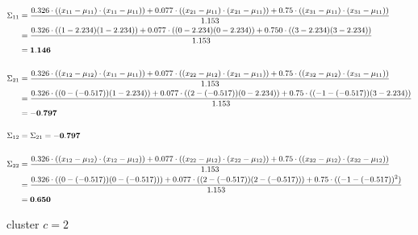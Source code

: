 \documentclass[12pt]{article}
\begin{document}
\begin{enumerate}
        \begin{equation*}
            \fontsize{9pt}{10pt}\selectfont
            \begin{aligned}
                \Sigma_{11} &= \frac{0.326 \cdot ((x_{11}-\mu_{11}) \cdot (x_{11} - \mu_{11}))+ 0.077 \cdot ((x_{21}-\mu_{11}) \cdot (x_{21} - \mu_{11}))+ 0.75 \cdot ((x_{31}-\mu_{11}) \cdot (x_{31} - \mu_{11}))}{1.153}\\
                &=\frac{0.326 \cdot ((1-2.234)(1-2.234)) + 0.077 \cdot ((0-2.234)(0-2.234))+ 0.750 \cdot ((3-2.234)(3-2.234))}{1.153} \\
                &= \mathbf{1.146}\\
                \\
                \Sigma_{21} &= \frac{0.326 \cdot ((x_{12}-\mu_{12}) \cdot (x_{11} - \mu_{11}))+ 0.077 \cdot ((x_{22}-\mu_{12}) \cdot (x_{21} - \mu_{11}))+ 0.75 \cdot ((x_{32}-\mu_{12}) \cdot (x_{31} - \mu_{11}))}{1.153}\\
                &=\frac{0.326 \cdot ((0-(-0.517))(1 - 2.234)) + 0.077 \cdot ((2-(-0.517))(0-2.234)) + 0.75 \cdot ((-1-(-0.517))(3-2.234))}{1.153} \\
                &= \mathbf{-0.797}\\
                \\
                \Sigma_{12} &= \Sigma_{21} = \mathbf{-0.797}\\
                \\
                \Sigma_{22} &= \frac{0.326 \cdot ((x_{12}-\mu_{12}) \cdot (x_{12} - \mu_{12}))+ 0.077 \cdot ((x_{22}-\mu_{12}) \cdot (x_{22} - \mu_{12}))+ 0.75 \cdot ((x_{32}-\mu_{12}) \cdot (x_{32} - \mu_{12}))}{1.153}\\
                &=\frac{0.326 \cdot ((0-(-0.517))(0-(-0.517))) + 0.077 \cdot ((2-(-0.517))(2-(-0.517))) + 0.75 \cdot ((-1-(-0.517))^2)}{1.153}\\
                &= \mathbf{0.650}\\
            \end{aligned}
        \end{equation*}

    \vspace{20pt}
     {cluster $c=2$}


\end{enumerate}
\end{document}
